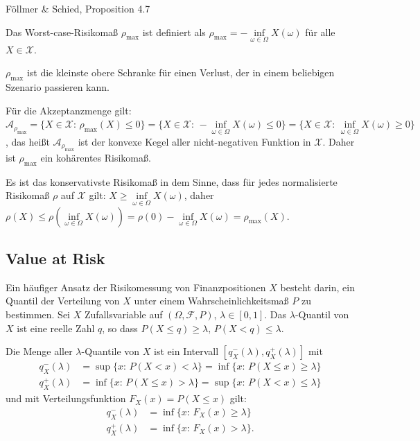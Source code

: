 \documentclass[a4paper,twoside,DIV15,BCOR12mm]{scrbook}
\begin{document}
\begin{beweis}
Föllmer \& Schied, Proposition 4.7
\end{beweis}

\begin{beispiel}
Das Worst-case-Risikomaß $\rho_{\max}$ ist definiert als $\rho_{\max}=-\inf\limits_{\omega\in\Omega} X(\omega)$ für alle $X\in\mathcal{X}$.

$\rho_{\max}$ ist die kleinste obere Schranke für einen Verlust, der in einem beliebigen Szenario passieren kann.

Für die Akzeptanzmenge gilt: $\mathcal{A}_{\rho_{\max}}=\{X\in\mathcal{X}:\, \rho_{\max}(X)\leq 0\}=\{X\in\mathcal{X}:\, -\inf\limits_{\omega\in\Omega} X(\omega) \leq 0\}=\{X\in\mathcal{X}:\, \inf\limits_{\omega\in\Omega} X(\omega) \geq 0\}$, das heißt $\mathcal{A}_{\rho_{\max}}$ ist der konvexe Kegel aller nicht-negativen Funktion in $\mathcal{X}$. Daher ist $\rho_{\max}$ ein kohärentes Risikomaß.

Es ist das konservativste Risikomaß in dem Sinne, dass für jedes normalisierte Risikomaß $\rho$ auf $\mathcal{X}$ gilt: $X\geq\inf\limits_{\omega\in\Omega} X(\omega)$, daher $\rho(X)\leq \rho(\inf\limits_{\omega\in\Omega} X(\omega))=\rho(0)-\inf\limits_{\omega\in\Omega} X(\omega)=\rho_{\max}(X)$.
\end{beispiel}

\subsection{Value at Risk}

Ein häufiger Ansatz der Risikomessung von Finanzpositionen $X$ besteht darin, ein Quantil der Verteilung von $X$ unter einem Wahrscheinlichkeitsmaß $ P$ zu bestimmen. Sei $X$ Zufallsvariable auf $(\Omega,\mathcal{F}, P)$, $\lambda\in[0, 1]$. Das $\lambda$-Quantil von $X$ ist eine reelle Zahl $q$, so dass $ P(X\leq q) \geq \lambda,\,  P(X< q) \leq \lambda$.

Die Menge aller $\lambda$-Quantile von $X$ ist ein Intervall $[q_X^-(\lambda),q_X^+(\lambda)]$ mit 
\begin{align*}
q_X^-(\lambda)&=\sup\{x:\,  P(X<x)<\lambda\}=\inf\{x:\,  P(X\leq x)\geq \lambda\} \\
q_X^+(\lambda)&=\inf\{x:\,  P(X\leq x)>\lambda\}=\sup\{x:\,  P(X < x)\leq \lambda\}
\end{align*}
und mit Verteilungsfunktion $F_X(x)= P(X\leq x)$ gilt:
\begin{align*}
q_X^-(\lambda)&=\inf\{x:\, F_X(x)\geq \lambda\}\\
q_X^+(\lambda)&=\inf\{x:\, F_X(x)> \lambda\}.
\end{align*}
\end{document}
